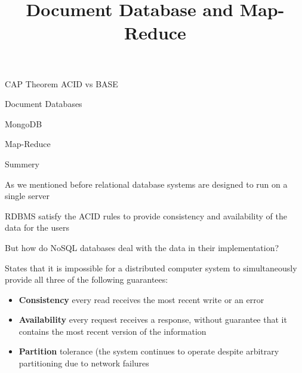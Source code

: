 \documentclass{beamer}
\title{Document Database and Map-Reduce}
\author{ }
\institute{Hogeschool Rotterdam \\ 
Rotterdam, Netherlands}
\date{}
\begin{document}
\maketitle

\begin{slide}{
\item CAP Theorem ACID vs BASE
\item Document Databases 
\item MongoDB
\item Map-Reduce 
\item Summery
}\end{slide}

\begin{slide}{
\item As we mentioned before relational database systems are designed to run on a single server
\item RDBMS satisfy the ACID rules to provide consistency and availability of the data for the users  
\item But how do NoSQL databases deal with the data in their implementation?
}\end{slide}

\begin{slide}{
\item States that it is impossible for a distributed computer system to simultaneously provide all three of the following guarantees:
\begin{itemize}
	\item \textbf{Consistency} every read receives the most recent write or an error
	\item \textbf{Availability} every request receives a response, without guarantee that it contains the most recent version of the information
	\item \textbf{Partition} tolerance (the system continues to operate despite arbitrary partitioning due to network failures
\end{itemize}
}\end{slide}
\end{document}

